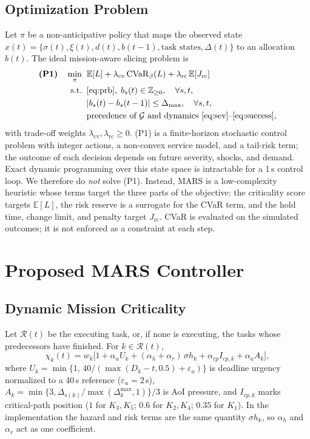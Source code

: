 \documentclass[conference]{IEEEtran}
\begin{document}
\subsection{Optimization Problem}
Let $\pi$ be a non-anticipative policy that maps the observed state $x(t)=\{\sigma(t),\xi(t),d(t),b(t-1),\text{task states},\Delta(t)\}$ to an allocation $b(t)$. The ideal mission-aware slicing problem is
\begin{equation}
\begin{aligned}
\textbf{(P1)}\quad \min_{\pi}\;\; & \mathbb{E}[L] + \lambda_{\mathrm{cv}}\,\mathrm{CVaR}_{\beta}(L) + \lambda_{\mathrm{rc}}\,\mathbb{E}[J_{\mathrm{rc}}]\\
\text{s.t.}\;\; & \eqref{eq:prb},\; b_s(t)\in\mathbb{Z}_{\ge0}, \quad \forall s,t,\\
& |b_s(t)-b_s(t-1)|\le\Delta_{\max}, \quad \forall s,t,\\
& \text{precedence of }\mathcal{G}\text{ and dynamics }\eqref{eq:sev}\text{--}\eqref{eq:success},
\end{aligned}
\label{eq:p1}
\end{equation}
with trade-off weights $\lambda_{\mathrm{cv}},\lambda_{\mathrm{rc}}\ge0$. (P1) is a finite-horizon stochastic control problem with integer actions, a non-convex service model, and a tail-risk term; the outcome of each decision depends on future severity, shocks, and demand. Exact dynamic programming over this state space is intractable for a 1\,s control loop. We therefore do \emph{not} solve (P1). Instead, MARS is a low-complexity heuristic whose terms target the three parts of the objective: the criticality score targets $\mathbb{E}[L]$, the risk reserve is a surrogate for the CVaR term, and the hold time, change limit, and penalty target $J_{\mathrm{rc}}$. CVaR is evaluated on the simulated outcomes; it is not enforced as a constraint at each step.

\section{Proposed MARS Controller}\label{sec:mars}
\subsection{Dynamic Mission Criticality}
Let $\mathcal{R}(t)$ be the executing task, or, if none is executing, the tasks whose predecessors have finished. For $k\in\mathcal{R}(t)$,
\begin{equation}
\chi_k(t)=w_k\big[1+\alpha_u U_k+(\alpha_h+\alpha_r)\,\sigma h_k+\alpha_{cp}I_{cp,k}+\alpha_a A_k\big],
\label{eq:criticality}
\end{equation}
where $U_k=\min\{1,\,40/(\max(D_k-t,0.5)+\varepsilon_u)\}$ is deadline urgency normalized to a 40\,s reference ($\varepsilon_u=2$\,s), $A_k=\min\{3,\Delta_{s(k)}/\max(\Delta_k^{\max},1)\}/3$ is AoI pressure, and $I_{cp,k}$ marks critical-path position ($1$ for $K_3,K_5$; $0.6$ for $K_2,K_4$; $0.35$ for $K_1$). In the implementation the hazard and risk terms are the same quantity $\sigma h_k$, so $\alpha_h$ and $\alpha_r$ act as one coefficient.
\end{document}
